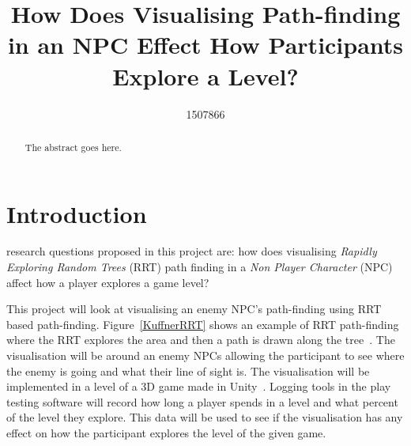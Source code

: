 \documentclass[journal]{IEEEtran}
\begin{document}
%
\title{ How Does Visualising Path-finding in an NPC Effect How Participants Explore a Level?}
%
%
\author{1507866}


\maketitle

\begin{abstract}
The abstract goes here.
\end{abstract}

\section{Introduction}
% 
% 
% 
% 
 research questions proposed in this project are: how does visualising \textit{Rapidly Exploring Random Trees} (RRT) path finding in a \textit{Non Player Character} (NPC) affect how a player explores a game level?

This project will look at visualising an enemy NPC's path-finding using RRT based path-finding. Figure~\ref{KuffnerRRT} shows an example of RRT path-finding where the RRT explores the area and then a path is drawn along the tree~\cite{Kuffner2000}.  The visualisation will be around an enemy NPCs allowing the participant to see where the enemy is going and what their line of sight is. The visualisation will be implemented in a level of a 3D game made in Unity~\cite{software:Unity}. Logging tools in the play testing software will record how long a player spends in a level and what percent of the level they explore. This data will be used to see if the visualisation has any effect on how the participant explores the level of the given game. 
\end{document}
